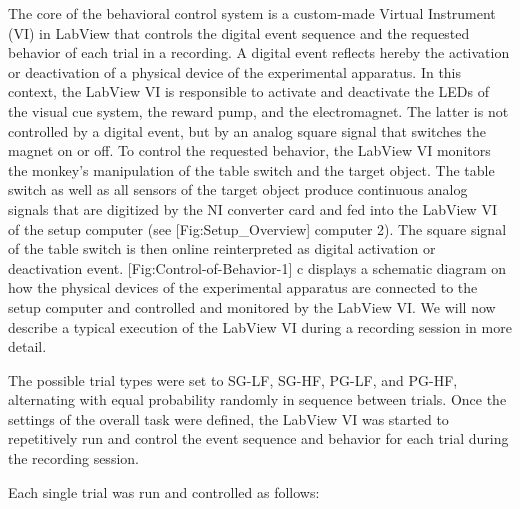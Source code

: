 The core of the behavioral control system is a custom-made Virtual Instrument (VI) in LabView that controls the digital event sequence and the requested behavior of each trial in a recording. A digital event reflects hereby the activation or deactivation of a physical device of the experimental apparatus. In this context, the LabView VI is responsible to activate and deactivate the LEDs of the visual cue system, the reward pump, and the electromagnet. The latter is not controlled by a digital event, but by an analog square signal that switches the magnet on or off. To control the requested behavior, the LabView VI monitors the monkey's manipulation of the table switch and the target object. The table switch as well as all sensors of the target object produce continuous analog signals that are digitized by the NI converter card and fed into the LabView VI of the setup computer (see [Fig:Setup\_Overview] computer 2). The square signal of the table switch is then online reinterpreted as digital activation or deactivation event. [Fig:Control-of-Behavior-1] c displays a schematic diagram on how the physical devices of the experimental apparatus are connected to the setup computer and controlled and monitored by the LabView VI. We will now describe a typical execution of the LabView VI during a recording session in more detail. 

The possible trial types were set to SG-LF, SG-HF, PG-LF, and PG-HF, alternating with equal probability randomly in sequence between trials. Once the settings of the overall task were defined, the LabView VI was started to repetitively run and control the event sequence and behavior for each trial during the recording session. 

Each single trial was run and controlled as follows: 

